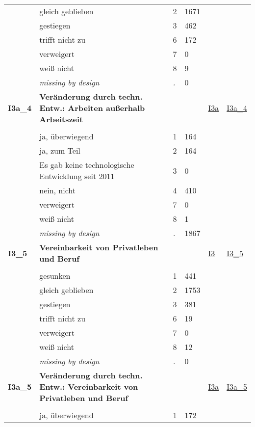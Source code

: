\begin{longtable}{| L{2.45cm} | L{6cm} | C{1.5cm} | R{1cm} | C{2.25cm} | C{2.25cm} |}
   & gleich geblieben & 2 & 1671 &  &  \\ 
   & gestiegen & 3 & 462 &  &  \\ 
   & trifft nicht zu & 6 & 172 &  &  \\ 
   & verweigert & 7 & 0 &  &  \\ 
   & weiß nicht & 8 & 9 &  &  \\ 
   & \textit{missing by design} & \textit{.} & 0 &  &  \\ 
   \midrule
\textbf{I3a\_4}\label{var:I3a:4} & \textbf{Veränderung durch techn. Entw.: Arbeiten außerhalb Arbeitszeit} &  &  & \hyperref[I3a]{I3a} & \hyperref[var:suf:I3a:4]{I3a\_4} \\ 
   &  &  &  &  &  \\ 
   & ja, überwiegend & 1 & 164 &  &  \\ 
   & ja, zum Teil & 2 & 164 &  &  \\ 
   & Es gab keine technologische Entwicklung seit 2011 & 3 & 0 &  &  \\ 
   & nein, nicht & 4 & 410 &  &  \\ 
   & verweigert & 7 & 0 &  &  \\ 
   & weiß nicht & 8 & 1 &  &  \\ 
   & \textit{missing by design} & \textit{.} & 1867 &  &  \\ 
   \midrule
\textbf{I3\_5}\label{var:I3:5} & \textbf{Vereinbarkeit von Privatleben und Beruf} &  &  & \hyperref[I3]{I3} & \hyperref[var:suf:I3:5]{I3\_5} \\ 
   &  &  &  &  &  \\ 
   & gesunken & 1 & 441 &  &  \\ 
   & gleich geblieben & 2 & 1753 &  &  \\ 
   & gestiegen & 3 & 381 &  &  \\ 
   & trifft nicht zu & 6 & 19 &  &  \\ 
   & verweigert & 7 & 0 &  &  \\ 
   & weiß nicht & 8 & 12 &  &  \\ 
   & \textit{missing by design} & \textit{.} & 0 &  &  \\ 
   \midrule
\textbf{I3a\_5}\label{var:I3a:5} & \textbf{Veränderung durch techn. Entw.: Vereinbarkeit von Privatleben und Beruf} &  &  & \hyperref[I3a]{I3a} & \hyperref[var:suf:I3a:5]{I3a\_5} \\ 
   &  &  &  &  &  \\ 
   & ja, überwiegend & 1 & 172 &  &  \\ 

\end{longtable}
